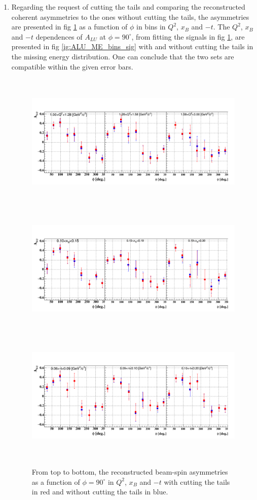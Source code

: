 \begin{enumerate}
\begin{enumerate}
 \item Regarding the request of cutting the tails and comparing the 
reconstructed coherent asymmetries to the ones without cutting the tails, the 
asymmetries are presented in fig \ref{fig:BSA_ME_bins_sig} as a function of 
$\phi$ in bins in $Q^{2}$, $x_{B}$ and $-t$. The $Q^{2}$, $x_{B}$ and $-t$ 
dependences of $A_{LU}$ at $\phi = 90 ^{\circ}$, from fitting the signals in 
fig \ref{fig:BSA_ME_bins_sig}, are presented in fig \ref{ig:ALU_ME_bins_sig} 
with and without cutting the tails in the missing energy distribution.  One can 
conclude that the two sets are compatible within the given error bars. 
   
    \begin{figure}[tbp]
     \centering
       \includegraphics[height=6.5cm]{fig_new/BSA_Coh_Comb_Q2_ME.png}
       \includegraphics[height=6.5cm]{fig_new/BSA_Coh_Comb_xB_ME.png}
       \includegraphics[height=6.5cm]{fig_new/BSA_Coh_Comb_t_ME.png}
   \caption{From top to bottom, the reconstructed beam-spin asymmetries as a 
      function of $\phi = 90 ^{\circ}$ in $Q^{2}$,
$x_{B}$ and $-t$ with cutting the tails in red and without cutting the tails in 
blue.  }
   \label{fig:BSA_ME_bins_sig}
    \end{figure}


\end{enumerate}
\end{enumerate}
